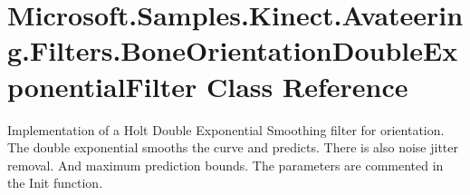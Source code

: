 \hypertarget{class_microsoft_1_1_samples_1_1_kinect_1_1_avateering_1_1_filters_1_1_bone_orientation_double_exponential_filter}{\section{Microsoft.\+Samples.\+Kinect.\+Avateering.\+Filters.\+Bone\+Orientation\+Double\+Exponential\+Filter Class Reference}
\label{class_microsoft_1_1_samples_1_1_kinect_1_1_avateering_1_1_filters_1_1_bone_orientation_double_exponential_filter}
}


Implementation of a Holt Double Exponential Smoothing filter for orientation. The double exponential smooths the curve and predicts. There is also noise jitter removal. And maximum prediction bounds. The parameters are commented in the Init function.  


